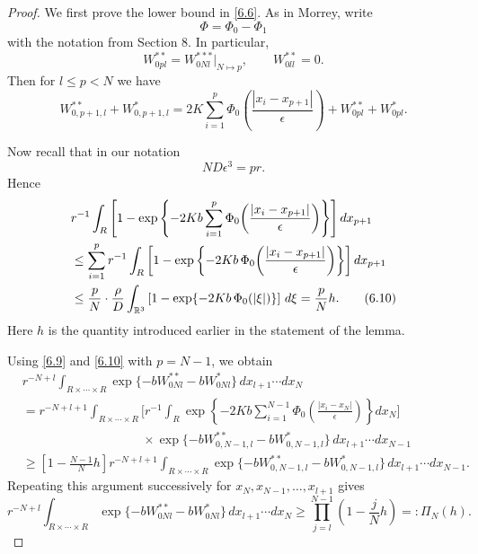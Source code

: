 \documentclass[11pt]{article}
\begin{document}
\begin{proof}
We first prove the lower bound in \eqref{6.6}. As in Morrey, write
\[
\Phi=\Phi_0-\Phi_1
\]
with the notation from Section 8. In particular,
\[
W^{**}_{0pl}=W^{***}_{0Nl}\big|_{N\mapsto p},\qquad W^{**}_{0ll}=0.
\]
Then for $l\le p < N$ we have
\begin{equation}
W^{**}_{0,p+1,l}+W^{*}_{0,p+1,l}
=
2K\sum_{i=1}^p \Phi_0\!\left(\frac{|x_i-x_{p+1}|}{\epsilon}\right)
+
W^{**}_{0pl}+W^{*}_{0pl}.
\tag{6.9}\label{6.9}
\end{equation}

Now recall that in our notation
\[
ND\epsilon^3=pr.
\]
Hence
\begin{align}
&r^{-1}\int_R
\left[
1-\exp\left\{-2Kb\sum_{i=1}^p \Phi_0\!\left(\frac{|x_i-x_{p+1}|}{\epsilon}\right)\right\}
\right]dx_{p+1}
\notag\\
&\le
\sum_{i=1}^p
r^{-1}\int_R
\left[
1-\exp\left\{-2Kb\,\Phi_0\!\left(\frac{|x_i-x_{p+1}|}{\epsilon}\right)\right\}
\right]dx_{p+1}
\notag\\
&\le
\frac{p}{N}\cdot \frac{\rho}{D}
\int_{\mathbb R^3}
\left[1-\exp\{-2Kb\,\Phi_0(|\xi|)\}\right]\,d\xi
=
\frac{p}{N}h.
\tag{6.10}\label{6.10}
\end{align}
Here $h$ is the quantity introduced earlier in the statement of the lemma.

Using \eqref{6.9} and \eqref{6.10} with $p=N-1$, we obtain
\begin{align*}
&r^{-N+l}\int_{R\times\cdots\times R}
\exp\{-bW^{**}_{0Nl}-bW^{*}_{0Nl}\}\,dx_{l+1}\cdots dx_N
\\
&=
r^{-N+l+1}\int_{R\times\cdots\times R}
\Bigg[
r^{-1}\int_R
\exp\left\{-2Kb\sum_{i=1}^{N-1}\Phi_0\!\left(\frac{|x_i-x_N|}{\epsilon}\right)\right\}dx_N
\Bigg]
\\
&\hspace{4cm}\times
\exp\{-bW^{**}_{0,N-1,l}-bW^{*}_{0,N-1,l}\}\,dx_{l+1}\cdots dx_{N-1}
\\
&\ge
\left[1-\frac{N-1}{N}h\right]
r^{-N+l+1}
\int_{R\times\cdots\times R}
\exp\{-bW^{**}_{0,N-1,l}-bW^{*}_{0,N-1,l}\}\,dx_{l+1}\cdots dx_{N-1}.
\end{align*}
Repeating this argument successively for $x_N,x_{N-1},\dots,x_{l+1}$ gives
\begin{equation}
r^{-N+l}\int_{R\times\cdots\times R}
\exp\{-bW^{**}_{0Nl}-bW^{*}_{0Nl}\}\,dx_{l+1}\cdots dx_N
\ge
\prod_{j=l}^{N-1}\left(1-\frac{j}{N}h\right)
=: \Pi_N(h).
\tag{6.11}\label{6.11}
\end{equation}


\end{proof}
\end{document}
